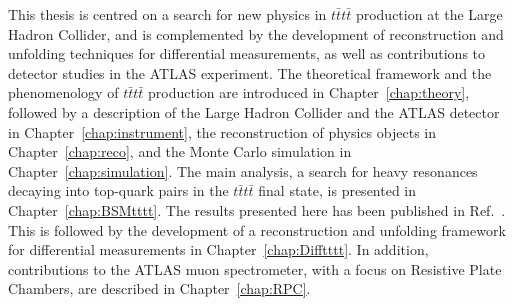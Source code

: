 This thesis is centred on a search for new physics in $t\bar{t}t\bar{t}$ production at the Large Hadron Collider, and is complemented by the development of reconstruction and unfolding techniques for differential measurements, as well as contributions to detector studies in the ATLAS experiment. 
The theoretical framework and the phenomenology of $t\bar{t}t\bar{t}$ production are introduced in Chapter~\ref{chap:theory},
followed by a description of the Large Hadron Collider and the ATLAS detector in Chapter~\ref{chap:instrument}, 
the reconstruction of physics objects in Chapter~\ref{chap:reco}, 
and the Monte Carlo simulation in Chapter~\ref{chap:simulation}. 
The main analysis, a search for heavy resonances decaying into top-quark pairs in the $t\bar{t}t\bar{t}$ final state, is presented in Chapter~\ref{chap:BSMtttt}. 
The results presented here has been published in Ref.~\cite{ATLAS_tttt_2025_EPJC}.
This is followed by the development of a reconstruction and unfolding framework for differential measurements in Chapter~\ref{chap:Difftttt}. 
In addition, contributions to the ATLAS muon spectrometer, with a focus on Resistive Plate Chambers, are described in Chapter~\ref{chap:RPC}. 